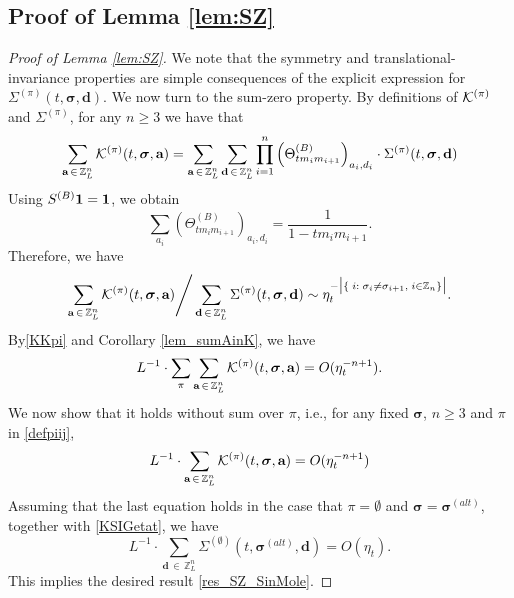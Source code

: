\documentclass[10pt,reqno]{article}
\theoremstyle{plain} %
\theoremstyle{remark}
\numberwithin{equation}{section}
\begin{document}
\subsection{Proof of Lemma  \ref{lem:SZ}}



\begin{proof}[ Proof of Lemma  \ref{lem:SZ}]
We note that the symmetry and translational-invariance properties are simple consequences of the explicit expression for $\Sigma^{(\pi)}(t, \boldsymbol{\sigma}, \textbf{d})$. We now turn to the sum-zero property.
By   definitions of ${\cal K}^{(\pi)}$ and $\Sigma^{(\pi)}$, for any $n\ge 3$ we have that 
\begin{equation} 
 \sum_{\textbf{a}\,\in \,\mathbb Z^{n}_L } 
{\cal K}^{(\pi)}(t, \boldsymbol{\sigma}, \textbf{a})
= \sum_{\textbf{a}\,\in \,\mathbb Z^{n}_L } \sum_{\textbf{d}\,\in \,\mathbb Z^{n}_L } \prod_{i=1}^n \left(\Theta^{(B)}_{tm_im_{i+1}}\right)_{a_i,d_i}\cdot \Sigma^{(\pi)}(t, \boldsymbol{\sigma}, \textbf{d})    
\end{equation}
Using $S^{(B)} \bf 1 = \bf 1$, we obtain  
$$
\sum_{a_i}\left(\Theta^{(B)}_{tm_im_{i+1}}\right)_{a_i,d_i}=\frac{1}{1-tm_im_{i+1}}.
$$
Therefore, we have 
\begin{equation}\label{KSIGetat}
 \sum_{\textbf{a}\,\in \,\mathbb Z^{n}_L } 
{\cal K}^{(\pi)}(t, \boldsymbol{\sigma}, \textbf{a})
 \Bigg/\sum_{\textbf{d}\,\in \,\mathbb Z^{n}_L } \Sigma^{(\pi)}(t, \boldsymbol{\sigma}, \textbf{d})    \sim \eta_t^{-\big|\{\;i: \;\sigma_i\ne \sigma_{i+1}, \; i\in \mathbb Z_n\}\big|}  .
\end{equation}
By\eqref{KKpi} and   Corollary \ref{lem_sumAinK}, we have  
\begin{align}\label{LKsigm0}
 L^{-1}\cdot \sum_{\pi}\sum_{\textbf{a}\,\in \,\mathbb Z^{n}_L } 
{\cal K}^{(\pi)}(t, \boldsymbol{\sigma}, \textbf{a})= O(\eta_t^{-n+1}).
\end{align}
We now  show that it holds without sum over $\pi$, i.e.,    for  any fixed $\boldsymbol{\sigma}$, $n\ge 3$ and   $\pi$   in \eqref{defpiij}, 
\begin{align}\label{LKsigmas}
 L^{-1}\cdot \sum_{\textbf{a}\,\in \,\mathbb Z^{n}_L } 
{\cal K}^{(\pi)}(t, \boldsymbol{\sigma}, \textbf{a})=O(\eta_t^{-n+1})  
\end{align}
Assuming that  the last equation  holds in the case that
$\pi=\emptyset$ and $\boldsymbol{\sigma}=\boldsymbol{\sigma}^{(alt)}$, 
  together with \eqref{KSIGetat},   we have 
\begin{equation}
   L^{-1} \cdot \sum_{\textbf{d}\,\in \,\mathbb Z^{n}_L } \Sigma^{(\emptyset)}(t, \boldsymbol{\sigma}^{(alt)}, \textbf{d}) =O(\eta_t).
\end{equation}
This  implies the desired result \eqref{res_SZ_SinMole}. 


\end{proof}
\end{document}
